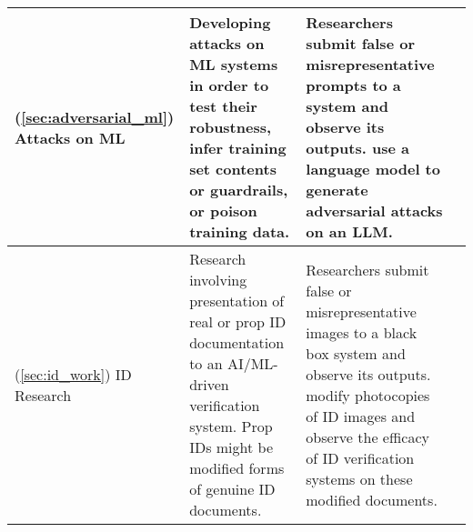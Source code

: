 \begin{table*}[ht]
\begin{tabular}{p{2cm}|p{6.0cm}p{6.0cm}p{2cm}}
        \hline
        (\ref{sec:adversarial_ml}) Attacks on ML & Developing attacks on ML systems in order to test their robustness, infer training set contents or guardrails, or poison training data. & Researchers submit false or misrepresentative prompts to a system and observe its outputs. \cite{perez2022red} use a language model to generate adversarial attacks on an LLM. & \cite{perez2022red, yanLLMAssistedEasyTriggerBackdoor, liuAFGenWholeFunctionFuzzing2024, yangSneakyPromptJailbreakingTextimage2024, yuDontListenMe2024} \\ 
        \hline \hline
        (\ref{sec:id_work}) ID Research & Research involving presentation of real or prop ID documentation to an AI/ML-driven verification system. Prop IDs might be modified forms of genuine ID documents. & Researchers submit false or misrepresentative images to a black box system and observe its outputs. \cite{di2019personal} modify photocopies of ID images and observe the efficacy of ID verification systems on these modified documents.  & \cite{di2022revisiting, di2019personal, zhao2021deep, engelbertzSecurityAnalysisEIDAS} 
        \\
        \hline \hline

        \end{tabular}
\label{tab:research_taxonomy}
\end{table*}